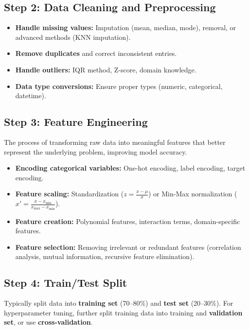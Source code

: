 \documentclass[11pt,a4paper]{article}
\begin{document}
\subsection{Step 2: Data Cleaning and Preprocessing}
\begin{itemize}[leftmargin=*]
  \item \textbf{Handle missing values:} Imputation (mean, median, mode), removal, or advanced methods (KNN imputation).
  \item \textbf{Remove duplicates} and correct inconsistent entries.
  \item \textbf{Handle outliers:} IQR method, Z-score, domain knowledge.
  \item \textbf{Data type conversions:} Ensure proper types (numeric, categorical, datetime).
\end{itemize}

\subsection{Step 3: Feature Engineering}
\begin{definitionbox}
The process of transforming raw data into meaningful features that better represent the underlying problem, improving model accuracy.
\end{definitionbox}
\begin{itemize}[leftmargin=*]
  \item \textbf{Encoding categorical variables:} One-hot encoding, label encoding, target encoding.
  \item \textbf{Feature scaling:} Standardization ($z = \frac{x - \mu}{\sigma}$) or Min-Max normalization ($x' = \frac{x - x_{\min}}{x_{\max} - x_{\min}}$).
  \item \textbf{Feature creation:} Polynomial features, interaction terms, domain-specific features.
  \item \textbf{Feature selection:} Removing irrelevant or redundant features (correlation analysis, mutual information, recursive feature elimination).
\end{itemize}

\subsection{Step 4: Train/Test Split}
\begin{conceptbox}
Typically split data into \textbf{training set} (70--80\%) and \textbf{test set} (20--30\%). For hyperparameter tuning, further split training data into training and \textbf{validation set}, or use \textbf{cross-validation}.
\end{conceptbox}
\end{document}
